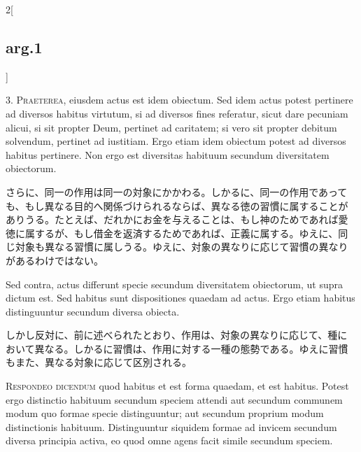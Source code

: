 \documentclass[paper=a4paper,fontsize=10pt,jafontsize=9pt,titlepage]{jlreq}
\begin{document}
\begin{paracol}{2}[\subsection{arg.1}]

3. {\scshape Praeterea}, eiusdem actus est idem obiectum. Sed idem
actus potest pertinere ad diversos habitus virtutum, si ad diversos
fines referatur, sicut dare pecuniam alicui, si sit propter Deum,
pertinet ad caritatem; si vero sit propter debitum solvendum, pertinet
ad iustitiam. Ergo etiam idem obiectum potest ad diversos habitus
pertinere. Non ergo est diversitas habituum secundum diversitatem
obiectorum.

\switchcolumn

さらに、同一の作用は同一の対象にかかわる。しかるに、同一の作用であって
も、もし異なる目的へ関係づけられるならば、異なる徳の習慣に属することが
ありうる。たとえば、だれかにお金を与えることは、もし神のためであれば愛
徳に属するが、もし借金を返済するためであれば、正義に属する。ゆえに、同
じ対象も異なる習慣に属しうる。ゆえに、対象の異なりに応じて習慣の異なり
があるわけではない。

\switchcolumn*[\subsection{s.c.}]

Sed contra, actus differunt specie secundum diversitatem obiectorum,
ut supra dictum est. Sed habitus sunt dispositiones quaedam ad
actus. Ergo etiam habitus distinguuntur secundum diversa obiecta.

\switchcolumn

しかし反対に、前に述べられたとおり、作用は、対象の異なりに応じて、種に
おいて異なる。しかるに習慣は、作用に対する一種の態勢である。ゆえに習慣
もまた、異なる対象に応じて区別される。


{\scshape Respondeo dicendum} quod habitus et est forma quaedam, et
est habitus. Potest ergo distinctio habituum secundum speciem attendi
aut secundum communem modum quo formae specie distinguuntur; aut
secundum proprium modum distinctionis habituum. Distinguuntur siquidem
formae ad invicem secundum diversa principia activa, eo quod omne
agens facit simile secundum speciem.

\switchcolumn


\end{paracol}
\end{document}

